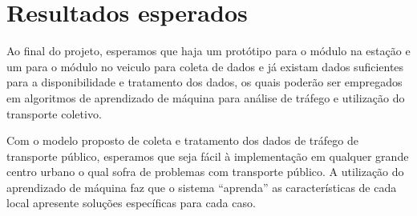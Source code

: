 \documentclass[12pt]{uftpibic}
\begin{document}
\vspace{1.5cm}
\chapter{Resultados esperados}

Ao final do projeto, esperamos que haja um protótipo para o módulo na estação e um para o módulo no veiculo para coleta de dados e já existam dados suficientes para a disponibilidade e tratamento dos dados, os quais poderão ser empregados em algoritmos de aprendizado de máquina para análise de tráfego e utilização do transporte coletivo.

Com o modelo proposto de coleta e tratamento dos dados de tráfego de transporte público, esperamos que seja fácil à implementação em qualquer grande centro urbano o qual sofra de problemas com transporte público. A utilização do aprendizado de máquina faz que o sistema ``aprenda'' as características de cada local apresente soluções específicas para cada caso.

\vspace{1.25cm}

\end{document}
